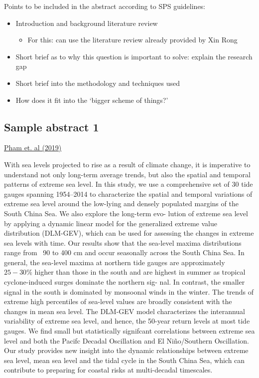\documentclass[12pt]{article}
\begin{document}
\begin{paragraph}
    \noindent Points to be included in the abstract according to SPS guidelines: 
\begin{itemize}
    \item Introduction and background literature review
    \begin{itemize}
        \item For this: can use the literature review already provided by Xin Rong
    \end{itemize}
    \item Short brief as to why this question is important to solve: explain the research gap 
    \item Short brief into the methodology and techniques used 
    \item How does it fit into the `bigger scheme of things?'
\end{itemize}
\end{paragraph} 
\subsection*{Sample abstract 1}
    \href{https://link.springer.com/article/10.1007/s11069-019-03596-2}{Pham et. al (2019)}
    \begin{paragraph}
        \noindent With sea levels projected to rise as a result of climate change, it is imperative to understand
not only long-term average trends, but also the spatial and temporal patterns of extreme sea
level. In this study, we use a comprehensive set of 30 tide gauges spanning 1954–2014 to
characterize the spatial and temporal variations of extreme sea level around the low-lying and densely populated margins of the South China Sea. We also explore the long-term evo-
lution of extreme sea level by applying a dynamic linear model for the generalized extreme value distribution (DLM-GEV), which can be used for assessing the changes in extreme
sea levels with time. Our results show that the sea-level maxima distributions range from
~90 to 400 cm and occur seasonally across the South China Sea. In general, the sea-level
maxima at northern tide gauges are approximately $25-30\%$ higher than those in the south and are highest in summer as tropical cyclone-induced surges dominate the northern sig-
nal. In contrast, the smaller signal in the south is dominated by monsoonal winds in the winter. The trends of extreme high percentiles of sea-level values are broadly consistent
with the changes in mean sea level. The DLM-GEV model characterizes the interannual variability of extreme sea level, and hence, the 50-year return levels at most tide gauges.
We find small but statistically signifcant correlations between extreme sea level and both
the Pacifc Decadal Oscillation and El Niño/Southern Oscillation. Our study provides new
insight into the dynamic relationships between extreme sea level, mean sea level and the
tidal cycle in the South China Sea, which can contribute to preparing for coastal risks at
multi-decadal timescales.
\end{paragraph}
\end{document}
